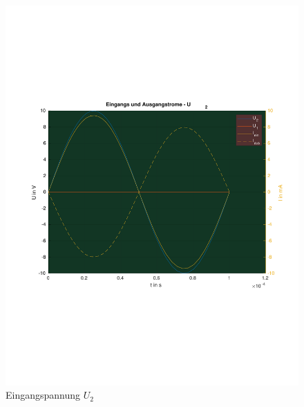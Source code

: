 \begin{figure}[H]
    \centering
    \includegraphics[clip,trim=50pt 200pt 20pt 200pt,scale=.8]{src/einausgangU_2.pdf}
    \caption{Eingangspannung $U_2$}
    \label{fig:Simulationplot2}
\end{figure}
%
\begin{flushright}
  \textit{\autorA}
\end{flushright}
%
%
%
%